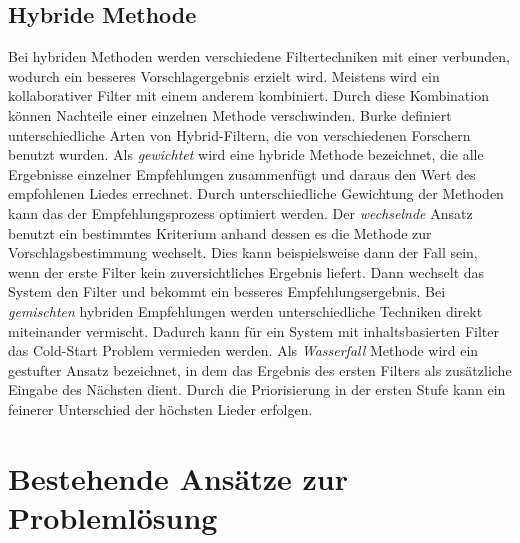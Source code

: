 \documentclass[twosided,a4,10pt]{article}
\begin{document}
\begin{multicols}{2}
\subsection{Hybride Methode}
Bei hybriden Methoden werden verschiedene Filtertechniken mit einer verbunden, wodurch ein besseres Vorschlagergebnis erzielt wird. Meistens wird ein kollaborativer Filter mit einem anderem kombiniert. Durch diese Kombination können Nachteile einer einzelnen Methode verschwinden. \cite{burke}\newline
Burke \cite{burke} definiert unterschiedliche Arten von Hybrid-Filtern, die von verschiedenen Forschern benutzt wurden.\newline
Als \textit{gewichtet} wird eine hybride Methode bezeichnet, die alle Ergebnisse einzelner Empfehlungen zusammenfügt und daraus den Wert des empfohlenen Liedes errechnet. Durch unterschiedliche Gewichtung der Methoden kann das der Empfehlungsprozess optimiert werden. Der \textit{wechselnde} Ansatz benutzt ein bestimmtes Kriterium anhand dessen es die Methode zur Vorschlagsbestimmung wechselt. Dies kann beispielsweise dann der Fall sein, wenn der erste Filter kein zuversichtliches Ergebnis liefert. Dann wechselt das System den Filter und bekommt ein besseres Empfehlungsergebnis. Bei \textit{gemischten} hybriden Empfehlungen werden unterschiedliche Techniken direkt miteinander vermischt. Dadurch kann für ein System mit inhaltsbasierten Filter das Cold-Start Problem vermieden werden. Als \textit{Wasserfall} Methode wird ein gestufter Ansatz bezeichnet, in dem das Ergebnis des ersten Filters als zusätzliche Eingabe des Nächsten dient. Durch die Priorisierung in der ersten Stufe kann ein feinerer Unterschied der höchsten Lieder erfolgen.

\section{Bestehende Ansätze zur Problemlösung}




\end{multicols}
\end{document}
